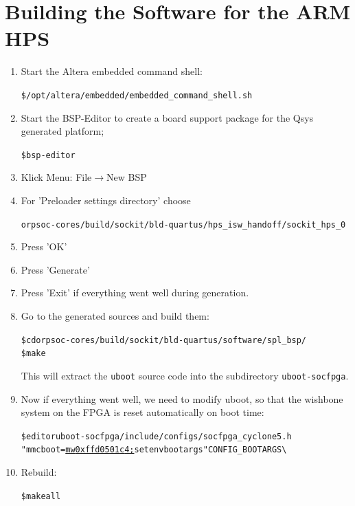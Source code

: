 \documentclass[twoside]{article}
\newcommand{\M}{$\rightarrow$}
\begin{document}
\section{Building the Software for the ARM HPS}
\begin{enumerate}
\item Start the Altera embedded command shell:
  \begin{alltt}
\$ /opt/altera/embedded/embedded_command_shell.sh
  \end{alltt}

\item Start the BSP-Editor to create a board support package for the
  Qsys generated platform;
  \begin{alltt}
\$ bsp-editor   
  \end{alltt}

\item Klick Menu: File\M New BSP

\item For 'Preloader settings directory' choose

  \texttt{orpsoc-cores/build/sockit/bld-quartus/hps\_isw\_handoff/sockit\_hps\_0}

\item Press 'OK'

\item Press 'Generate'

\item Press 'Exit' if everything went well during generation.

\item Go to the generated sources and build them:
  \begin{alltt}
\$ cd orpsoc-cores/build/sockit/bld-quartus/software/spl_bsp/    
\$ make
  \end{alltt}
  This will extract the \texttt{uboot} source code into the
  subdirectory \texttt{uboot-socfpga}.

\item Now if everything went well, we need to modify uboot, so that
  the wishbone system on the FPGA is reset automatically on boot time:
  \begin{alltt}
\$ editor uboot-socfpga/include/configs/socfpga_cyclone5.h
\hrulefill
    "mmcboot=\underline{mw 0xffd0501c 4;}setenv bootargs " CONFIG_BOOTARGS \textbackslash
\hrulefill
  \end{alltt}

\item Rebuild:
  \begin{alltt}
\$ make all    
  \end{alltt}


\end{enumerate}
\end{document}
